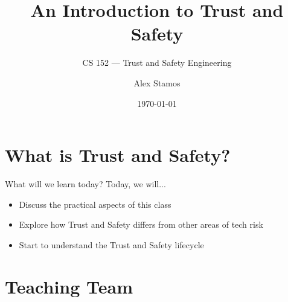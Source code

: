 \documentclass[nobackground,dvipsnames,table]{beamer}
\title{An Introduction to Trust and Safety}
\subtitle{CS 152 --- Trust and Safety Engineering}
\author[A. Stamos]{Alex Stamos}
\institute[Stanford University]{Stanford Cyber Policy Center}
\date[2022]{\today}
\begin{document}
\begin{frame}
    \titlepage
\end{frame}

\section{What is Trust and Safety?}

\begin{frame}{What will we learn today?}
    Today, we will...
    \begin{itemize}
        \item Discuss the practical aspects of this class
        \item Explore how Trust and Safety differs from other areas of tech risk
        \item Start to understand the Trust and Safety lifecycle
    \end{itemize}
\end{frame}

\section{Teaching Team}
\end{document}
